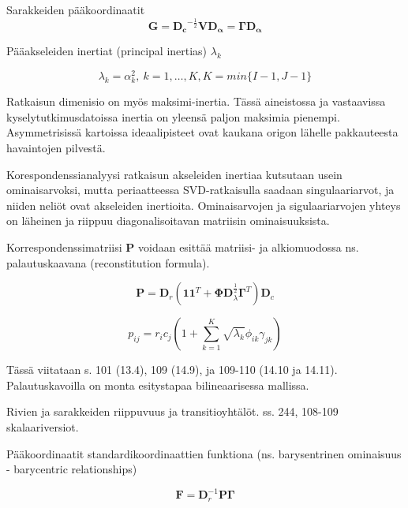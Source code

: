 \documentclass[
  finnish,
]{book}
\begin{document}
Sarakkeiden pääkoordinaatit
\begin{equation}
 \boldsymbol{G}  = \boldsymbol{D_c}^{-\frac{1}{2}} \boldsymbol{V} \boldsymbol{D_{\alpha}} = \boldsymbol{\Gamma}  \boldsymbol{D_{\alpha}}
 \label{eq:sarakeprinc1}
\end{equation}

Pääakseleiden inertiat (principal inertias) \(\lambda_{k}\)

\begin{equation}
\lambda_{k} = \alpha_{k}^2, \: k = 1,\dots,K,
K = min \{ I-1, J-1 \}
\end{equation}

Ratkaisun dimenisio on myös maksimi-inertia. Tässä aineistossa ja vastaavissa
kyselytutkimusdatoissa inertia on yleensä paljon maksimia pienempi. Asymmetrisissä
kartoissa ideaalipisteet ovat kaukana origon lähelle pakkauteesta havaintojen
pilvestä.

Korespondenssianalyysi ratkaisun akseleiden inertiaa kutsutaan usein ominaisarvoksi,
mutta periaatteessa SVD-ratkaisulla saadaan singulaariarvot, ja niiden neliöt ovat
akseleiden inertioita. Ominaisarvojen ja sigulaariarvojen yhteys on läheinen ja
riippuu diagonalisoitavan matriisin ominaisuuksista.

Korrespondenssimatriisi \(\boldsymbol{P}\) voidaan esittää matriisi- ja
alkiomuodossa ns. palautuskaavana (reconstitution formula).

\begin{equation}
\boldsymbol{P} = \boldsymbol{D}_{r} \left( \boldsymbol{1}\boldsymbol{1}^{T} + \boldsymbol{\Phi}\boldsymbol{D}_{\lambda}^{\frac {1}{2}}\boldsymbol{\Gamma}^{T}\right)\boldsymbol{D}_{c}
\label{eq:reconstform1}
\end{equation}

\begin{equation}
p_ {ij}= r_{i}c_{j} \left(1 + \sum_{k=1}^{K} \sqrt{\lambda_{k}} \phi_{ik} \gamma_{jk} \right)
\label{eq:reconstform2}
\end{equation}

Tässä viitataan s. 101 (13.4), 109 (14.9), ja 109-110 (14.10 ja 14.11).
Palautuskavoilla on monta esitystapaa bilineaarisessa mallissa.

Rivien ja sarakkeiden riippuvuus ja transitioyhtälöt. ss. 244, 108-109 skalaariversiot.

Pääkoordinaatit standardikoordinaattien funktiona
(ns. barysentrinen ominaisuus - barycentric relationships)

\begin{equation}
\boldsymbol{F} = \boldsymbol{D}_{r}^{-1} \boldsymbol{P}\boldsymbol{\Gamma}
\label{eq:barysentr1}
\end{equation}
\end{document}
